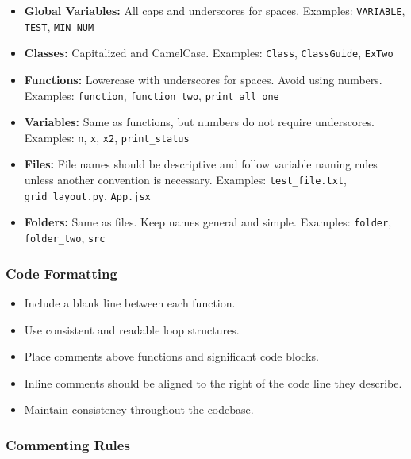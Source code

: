 \documentclass{article}
\begin{document}
\begin{itemize}
    \item \textbf{Global Variables:} All caps and underscores for spaces.  
    Examples: \texttt{VARIABLE}, \texttt{TEST}, \texttt{MIN\_NUM}
    
    \item \textbf{Classes:} Capitalized and CamelCase.  
    Examples: \texttt{Class}, \texttt{ClassGuide}, \texttt{ExTwo}
    
    \item \textbf{Functions:} Lowercase with underscores for spaces. Avoid using numbers.  
    Examples: \texttt{function}, \texttt{function\_two}, \texttt{print\_all\_one}
    
    \item \textbf{Variables:} Same as functions, but numbers do not require underscores.  
    Examples: \texttt{n}, \texttt{x}, \texttt{x2}, \texttt{print\_status}
    
    \item \textbf{Files:} File names should be descriptive and follow variable naming rules unless another convention is necessary.  
    Examples: \texttt{test\_file.txt}, \texttt{grid\_layout.py}, \texttt{App.jsx}
    
    \item \textbf{Folders:} Same as files. Keep names general and simple.  
    Examples: \texttt{folder}, \texttt{folder\_two}, \texttt{src}
\end{itemize}

\subsubsection{Code Formatting}

\begin{itemize}
    \item Include a blank line between each function.
    \item Use consistent and readable loop structures.
    \item Place comments above functions and significant code blocks.
    \item Inline comments should be aligned to the right of the code line they describe.
    \item Maintain consistency throughout the codebase.
\end{itemize}

\subsubsection{Commenting Rules}
\end{document}
